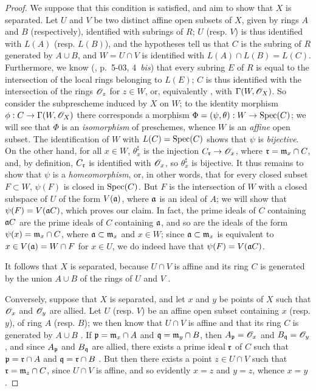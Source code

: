\begin{proof}
\label{proof-1.8.2.2}
We suppose that this condition is satisfied, and aim to show that $X$ is separated.
Let $U$ and $V$ be two distinct affine open subsets of $X$, given by rings $A$ and $B$ (respectively), identified with subrings of $R$;
$U$ (resp. $V$) is thus identified  with $L(A)$ (resp. $L(B)$), and the hypotheses tell us  that $C$ is the subring of $R$ generated by $A\cup B$, and $W=U\cap V$ is identified with $L(A)\cap L(B)=L(C)$.
Furthermore, we know (\cite{I-1}, p.~5-03, 4~\emph{bis}) that every subring $E$ of $R$ is equal to the intersection of the local rings belonging to $L(E)$;
$C$ is thus identified with the intersection of the rings $\mathscr{O}_z$ for $z\in W$, or, equivalently , with $\Gamma(W,\mathscr{O}_X)$.
So consider the subprescheme induced by $X$ on $W$;
to the identity morphism $\vphi: C\to\Gamma(W,\OO_X)$ there corresponds  a morphism $\Phi=(\psi,\theta):W\to\Spec(C)$;
we will see that $\Phi$ is an \emph{isomorphism} of preschemes, whence $W$ is an \emph{affine} open subset.
The identification of $W$ with $L(C)={\mathop{\mathrm{Spec}}\nolimits}(C)$ shows that $\psi$ is \emph{bijective}.
On the other hand, for all $x\in W$, $\theta_x^\sharp$ is the injection $C_\fk{r}\to\OO_x$, where $\mathfrak{r}=\mathfrak{m}_x\cap C$, and, by definition, $C_\mathfrak{r}$ is identified with $\mathscr{O}_x$, so $\theta_x^\sharp$ is bijective.
It thus remains to show that $\psi$ is a \emph{homeomorphism}, or, in other words, that for every closed subset $F\subset W$, $\psi(F)$ is closed in
${\mathop{\mathrm{Spec}}\nolimits}(C)$.
But $F$ is the intersection of $W$ with a closed subspace of $U$ of the form $V(\mathfrak{a})$, where $\mathfrak{a}$ is an ideal of $A$;
we will show that $\psi(F)=V(\mathfrak{a}C)$, which proves our claim.
In fact, the prime ideals of $C$ containing $\mathfrak{a}C$ are the prime ideals of $C$ containing $\mathfrak{a}$, and so are the ideals of the form $\psi(x)=\mathfrak{m}_x\cap C$, where $\mathfrak{a}\subset\mathfrak{m}_x$ and $x\in W$;
since $\mathfrak{a}\subset\mathfrak{m}_x$ is equivalent to $x\in V(\mathfrak{a})=W\cap F$ for $x\in U$, we do indeed have that $\psi(F)=V(\mathfrak{a}C)$.

It follows that $X$ is separated, because $U\cap V$ is affine and its ring $C$ is generated by the union $A\cup B$ of the rings of $U$ and $V$ .

Conversely, suppose that $X$ is separated, and let $x$ and $y$ be points of $X$ such that $\mathscr{O}_x$ and $\mathscr{O}_y$ are allied.
Let $U$ (resp. $V$) be an affine open subset containing $x$ (resp. $y$), of ring $A$ (resp. $B$);
we then know that $U\cap V$ is affine and that its ring $C$ is generated by $A\cup B$ .
If $\mathfrak{p}=\mathfrak{m}_x\cap A$ and $\mathfrak{q}=\mathfrak{m}_y\cap B$, then $A_\mathfrak{p}=\mathscr{O}_x$ and $B_\mathfrak{q}=\mathscr{O}_y$, and since $A_\mathfrak{p}$ and $B_\mathfrak{q}$ are allied, there exists a prime ideal $\mathfrak{r}$ of $C$ such that $\mathfrak{p}=\mathfrak{r}\cap A$ and $\mathfrak{q}=\mathfrak{r}\cap B$ .
But then there exists a point $z\in U\cap V$ such that $\mathfrak{r}=\mathfrak{m}_z\cap C$, since $U\cap V$ is affine, and so evidently $x=z$ and $y=z$, whence $x=y$.
\end{proof}

